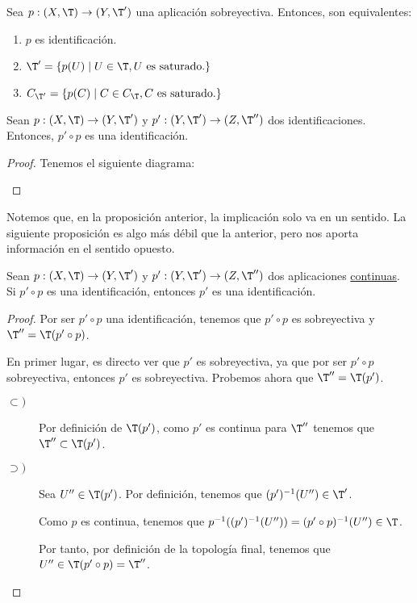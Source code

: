 \begin{coro}
    Sea $p:(X,\T)\to (Y,\T')$ una aplicación sobreyectiva. Entonces, son equivalentes:
    \begin{enumerate}
        \item $p$ es identificación.
        \item $\T' = \{p(U)\mid U\in \T, U \text{ es saturado.}\}$
        \item $C_{\T'}= \{p(C)\mid C\in C_{\T}, C \text{ es saturado.}\}$
    \end{enumerate}
\end{coro}


\begin{prop}
    Sean $p:(X,\T)\to (Y,\T')$ y $p':(Y,\T')\to (Z,\T'')$ dos identificaciones. Entonces, $p'\circ p$ es una identificación.
\end{prop}
\begin{proof}
    Tenemos el siguiente diagrama:
    \begin{center}
    \end{center}
\end{proof}

Notemos que, en la proposición anterior, la implicación solo va en un sentido. La siguiente proposición es algo más débil que la anterior, pero nos aporta información en el sentido opuesto.
\begin{prop}
    Sean $p:(X,\T)\to (Y,\T')$ y $p':(Y,\T')\to (Z,\T'')$ dos aplicaciones \ul{continuas}. Si $p'\circ p$ es una identificación, entonces $p'$ es una identificación.
\end{prop}
\begin{proof}
    Por ser $p'\circ p$ una identificación, tenemos que $p'\circ p$ es sobreyectiva y $\T''=\T(p'\circ p)$.
    
    
    En primer lugar, es directo ver que $p'$ es sobreyectiva, ya que por ser $p'\circ p$ sobreyectiva, entonces $p'$ es sobreyectiva. Probemos ahora que $\T''=\T(p')$.
    \begin{description}
        \item[$\subset)$] Por definición de $\T(p')$, como $p'$ es continua para $\T''$ tenemos que $\T''\subset \T(p')$.

        \item[$\supset)$] Sea $U''\in \T(p')$. Por definición, tenemos que $(p')^{-1}(U'')\in \T'$.

        Como $p$ es continua, tenemos que $p^{-1}((p')^{-1}(U''))= (p'\circ p)^{-1}(U'')\in \T$.

        Por tanto, por definición de la topología final, tenemos que $U''\in \T(p'\circ p)=\T''$.
    \end{description}
\end{proof}


